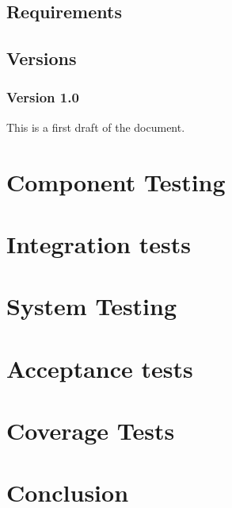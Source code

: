 \documentclass[signature]{deltares_manual}
\begin{document}
\section{Requirements}
\label{sec:requirements}


\section{Versions}
\label{sec:Versions}

\subsection{Version 1.0}
\label{sec:Version}
This is a first draft of the document.

\chapter{Component Testing} 
\label{chapterUnitTest}


\chapter{Integration tests}
\label{chapterIntegrationTests}


\chapter{System Testing} 
\label{chapterSystemTest}


\chapter{Acceptance tests} 
\label{chapterAcceptanceTest}


\chapter{Coverage Tests} 
\label{chapterCoverage}


\chapter{Conclusion} 
\label{chapterConclusion}
\end{document}
